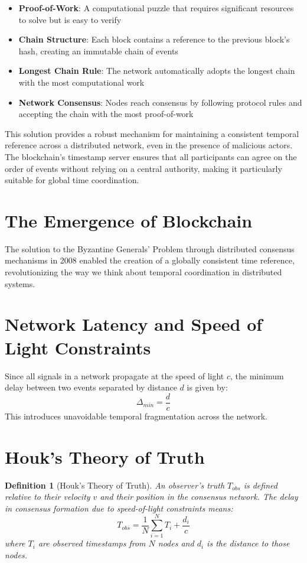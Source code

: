 \documentclass[12pt]{report}
\newtheorem{definition}{Definition}
\begin{document}
\begin{itemize}
    \item \textbf{Proof-of-Work}: A computational puzzle that requires significant resources to solve but is easy to verify
    \item \textbf{Chain Structure}: Each block contains a reference to the previous block's hash, creating an immutable chain of events
    \item \textbf{Longest Chain Rule}: The network automatically adopts the longest chain with the most computational work
    \item \textbf{Network Consensus}: Nodes reach consensus by following protocol rules and accepting the chain with the most proof-of-work
\end{itemize}

This solution provides a robust mechanism for maintaining a consistent temporal reference across a distributed network, even in the presence of malicious actors. The blockchain's timestamp server ensures that all participants can agree on the order of events without relying on a central authority, making it particularly suitable for global time coordination.

\section{The Emergence of Blockchain}
The solution to the Byzantine Generals' Problem through distributed consensus mechanisms in 2008 enabled the creation of a globally consistent time reference, revolutionizing the way we think about temporal coordination in distributed systems.

\section{Network Latency and Speed of Light Constraints}
Since all signals in a network propagate at the speed of light $c$, the minimum delay between two events separated by distance $d$ is given by:
\begin{equation}
\Delta_{min} = \frac{d}{c}
\end{equation}
This introduces unavoidable temporal fragmentation across the network.

\section{Houk's Theory of Truth}

\begin{definition}[Houk's Theory of Truth]
An observer's truth $T_{obs}$ is defined relative to their velocity $v$ and their position in the consensus network. The delay in consensus formation due to speed-of-light constraints means:
\begin{equation}
T_{obs} = \frac{1}{N} \sum_{i=1}^{N} T_i + \frac{d_i}{c}
\end{equation}
where $T_i$ are observed timestamps from $N$ nodes and $d_i$ is the distance to those nodes.
\end{definition}
\end{document}
